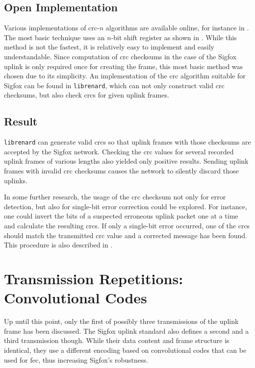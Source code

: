 \subsection{Open Implementation}
Various implementations of \gls{crc}-$n$ algorithms are available online, for instance in \cite{crcguide}.
The most basic technique uses an $n$-bit shift register as shown in \cite[Figure 14-5]{hackersdelight}.
While this method is not the fastest, it is relatively easy to implement and easily understandable.
Since computation of \gls{crc} checksums in the case of the Sigfox uplink is only required once for creating the frame, this most basic method was chosen due to its simplicity.
An implementation of the \gls{crc} algorithm suitable for Sigfox can be found in \texttt{librenard}, which can not only construct valid \gls{crc} checksums, but also check \glspl{crc} for given uplink frames.

\subsection{Result}
\texttt{librenard} can generate valid \glspl{crc} so that uplink frames with those checksums are accepted by the Sigfox network.
Checking the \gls{crc} values for several recorded uplink frames of various lengths also yielded only positive results.
Sending uplink frames with invalid \gls{crc} checksums causes the network to silently discard those uplinks.

In some further research, the usage of the \gls{crc} checksum not only for error detection, but also for single-bit error correction could be explored.
For instance, one could invert the bits of a suspected erroneous uplink packet one at a time and calculate the resulting \glspl{crc}.
If only a single-bit error occurred, one of the \glspl{crc} should match the transmitted \gls{crc} value and a corrected message has been found.
This procedure is also described in \cite[Section 14-2]{hackersdelight}.

\FloatBarrier
\section{Transmission Repetitions: Convolutional Codes}
\label{sec:ul_repetitions}
Up until this point, only the first of possibly three transmissions of the uplink frame has been discussed.
The Sigfox uplink standard also defines a second and a third transmission though.
While their data content and frame structure is identical, they use a different encoding based on convolutional codes that can be used for \gls{fec}, thus increasing Sigfox's robustness.

